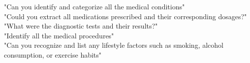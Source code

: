 "Can you identify and categorize all the medical conditions"\\
"Could you extract all medications prescribed and their corresponding dosages?"\\
"What were the diagnostic tests and their results?"\\
"Identify all the medical procedures"\\
"Can you recognize and list any lifestyle factors such as smoking, alcohol consumption, or exercise habits"